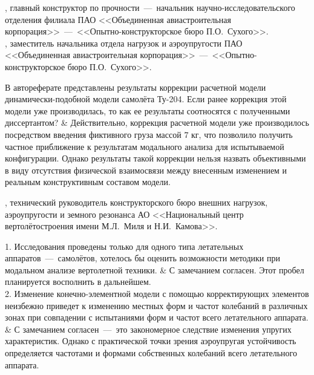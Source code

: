 \begin{frame}
	\beginSkip
	, главный конструктор по прочности~---~начальник научно-исследовательского отделения филиала ПАО <<Объединенная авиастроительная корпорация>>~---~<<Опытно-конструкторское бюро П.О.~Сухого>>. \\
	, заместитель начальника отдела нагрузок и аэроупругости ПАО <<Объединенная авиастроительная корпорация>>~---~<<Опытно-конструкторское бюро П.О.~Сухого>>. \\
	\begin{comtblr}{15em}
		В автореферате представлены результаты коррекции расчетной модели динамически-подобной модели самолёта Ту-204. Если ранее коррекция этой модели уже производилась, то как ее результаты соотносятся с полученными диссертантом?
		&
		Действительно, коррекция расчетной модели уже производилось посредством введения фиктивного груза массой $ 7 $ кг, что позволило получить частное приближение к результатам модального анализа для испытываемой конфигурации. Однако результаты такой коррекции нельзя назвать объективными в виду отсутствия физической взаимосвязи между внесенным изменением и реальным конструктивным составом модели. 
	\end{comtblr}
\end{frame}

\begin{frame}
	\beginSkip
	, технический руководитель конструкторского бюро внешних нагрузок, аэроупругости и земного резонанса АО <<Национальный центр вертолётостроения имени М.Л.~Миля и Н.И.~Камова>>. \\
	\begin{comtblr}{15em}
		1. Исследования проведены только для одного типа летательных аппаратов~---~самолётов, хотелось бы оценить возможности методики при модальном анализе вертолетной техники.
		&
		С замечанием согласен. Этот пробел планируется восполнить в дальнейшем. \\
		2. Изменение конечно-элементной модели с помощью корректирующих элементов неизбежно приведет к изменению местных форм и частот колебаний в различных зонах при совпадении с испытаниями форм и частот всего летательного аппарата.
		&
		С замечанием согласен~---~это закономерное следствие изменения упругих характеристик. Однако с практической точки зрения аэроупругая устойчивость определяется частотами и формами собственных колебаний всего летательного аппарата.
	\end{comtblr}
\end{frame}

